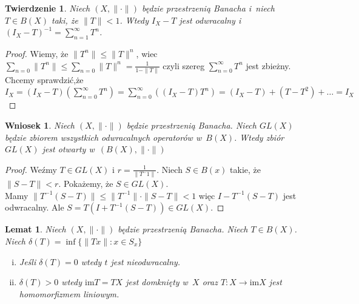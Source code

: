 \documentclass[11pt]{mwrep}
\renewcommand{\[}{\begin{equation}}
\renewcommand{\]}{\end{equation}}
\newcommand{\norm}{\|\cdot\|}
\newcommand{\im}{\mathrm{im}}
\newtheorem{twr}[subsection]{Twierdzenie}%
\newtheorem{lem}[subsection]{Lemat}
\newtheorem{wn}[subsection]{Wniosek}
\newcounter{numer}
\begin{document}
\begin{twr}
	Niech $(X,\norm)$ będzie przestrzenią Banacha i~niech $T\in B(X)$ taki, że $\|T\| <1$. Wtedy $I_X - T$ jest odwracalny i~
	$\left( I_X - T  \right)^{-1} = \sum_{n=1}^\infty T^n$.
\end{twr}
\begin{proof}
	Wiemy, że $\|T^n\|\le \|T\|^n$, wiec $\sum_{n=0}\|T^n\| \le \sum_{n=0} \|T\|^n = \frac{1}{1-\|T\|}$ czyli
	szereg $\sum_{n=0}^\infty T^n$ jest zbieżny. 
	Chcemy sprawdzić,że $I_X=(I_X -T)  \left( \sum_{n=0}^\infty T^n \right)= \sum_{n=0}^\infty \left( (I_X-T) T^n \right)=
	(I_X-T)+(T-T^2)+\ldots=I_X$
\end{proof}
\begin{wn}
	Niech $(X,\norm)$ będzie przestrzenią Banacha. Niech $GL(X)$ będzie zbiorem wszystkich odwracalnych operatorów w~$B(X)$.
	Wtedy zbiór $GL(X)$ jest otwarty w~$(B(X),\norm)$ 
\end{wn}
\begin{proof}
	Weźmy $T\in GL(X)$ i $r= \frac{1}{\|T^-1\|}$. Niech $S\in B(x)$ takie, że$\|S-T\|<r$.
	Pokażemy, że $S \in GL(X)$. \\
	Mamy $\|T^{-1}(S-T)\| \le \|T^{-1}\|\cdot\|S - T\| <1$ więc $I-T^{-1}(S - T)$ jest odwracalny.
	Ale $S= T(I+T^{-1}(S - T ))\in GL(X)$. 
\end{proof}
\begin{lem}
	Niech $(X,\norm)$ będzie przestrzenią Banacha. Niech $T \in B(X)$.
	Niech $\delta(T) = \inf\{ \|Tx\|: x \in S_x\}$ 
	\begin{enumerate}[(i)]
		\item Jeśli $\delta(T) = 0$ wtedy $t$ jest nieodwracalny.
		\item $\delta(T) >0$ wtedy $\im T =TX$ jest domknięty w~$X$ oraz $T\colon X \to \im X$ jest homomorfizmem liniowym.
	\end{enumerate}
\end{lem}
\end{document}
